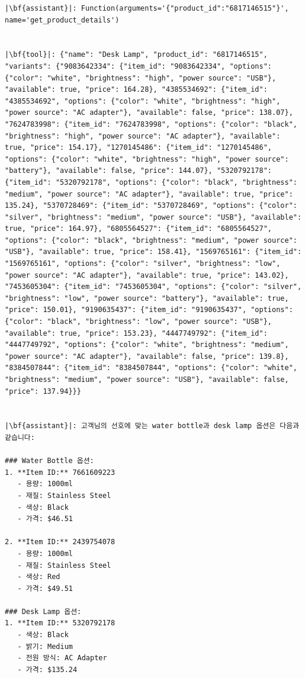 \begin{longlisting}
\begin{verbatim}
|\bf{assistant}|: Function(arguments='{"product_id":"6817146515"}', name='get_product_details')


|\bf{tool}|: {"name": "Desk Lamp", "product_id": "6817146515", "variants": {"9083642334": {"item_id": "9083642334", "options": {"color": "white", "brightness": "high", "power source": "USB"}, "available": true, "price": 164.28}, "4385534692": {"item_id": "4385534692", "options": {"color": "white", "brightness": "high", "power source": "AC adapter"}, "available": false, "price": 138.07}, "7624783998": {"item_id": "7624783998", "options": {"color": "black", "brightness": "high", "power source": "AC adapter"}, "available": true, "price": 154.17}, "1270145486": {"item_id": "1270145486", "options": {"color": "white", "brightness": "high", "power source": "battery"}, "available": false, "price": 144.07}, "5320792178": {"item_id": "5320792178", "options": {"color": "black", "brightness": "medium", "power source": "AC adapter"}, "available": true, "price": 135.24}, "5370728469": {"item_id": "5370728469", "options": {"color": "silver", "brightness": "medium", "power source": "USB"}, "available": true, "price": 164.97}, "6805564527": {"item_id": "6805564527", "options": {"color": "black", "brightness": "medium", "power source": "USB"}, "available": true, "price": 158.41}, "1569765161": {"item_id": "1569765161", "options": {"color": "silver", "brightness": "low", "power source": "AC adapter"}, "available": true, "price": 143.02}, "7453605304": {"item_id": "7453605304", "options": {"color": "silver", "brightness": "low", "power source": "battery"}, "available": true, "price": 150.01}, "9190635437": {"item_id": "9190635437", "options": {"color": "black", "brightness": "low", "power source": "USB"}, "available": true, "price": 153.23}, "4447749792": {"item_id": "4447749792", "options": {"color": "white", "brightness": "medium", "power source": "AC adapter"}, "available": false, "price": 139.8}, "8384507844": {"item_id": "8384507844", "options": {"color": "white", "brightness": "medium", "power source": "USB"}, "available": false, "price": 137.94}}}


|\bf{assistant}|: 고객님의 선호에 맞는 water bottle과 desk lamp 옵션은 다음과 같습니다:

### Water Bottle 옵션:
1. **Item ID:** 7661609223
   - 용량: 1000ml
   - 재질: Stainless Steel
   - 색상: Black
   - 가격: $46.51

2. **Item ID:** 2439754078
   - 용량: 1000ml
   - 재질: Stainless Steel
   - 색상: Red
   - 가격: $49.51

### Desk Lamp 옵션:
1. **Item ID:** 5320792178
   - 색상: Black
   - 밝기: Medium
   - 전원 방식: AC Adapter
   - 가격: $135.24


\end{verbatim}
\end{longlisting}
